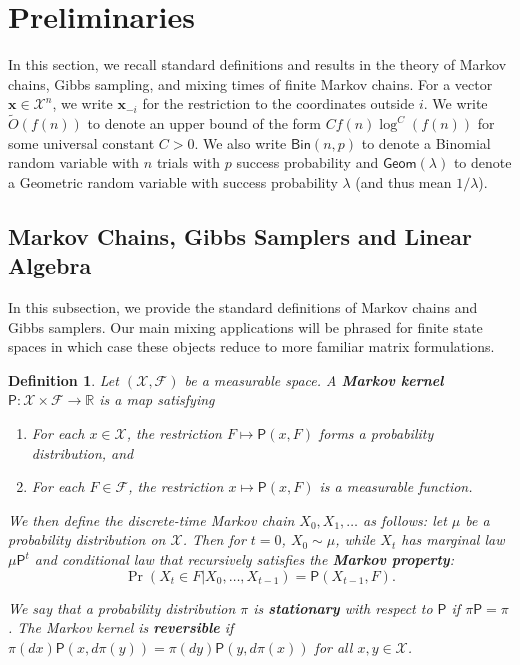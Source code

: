 \documentclass[11pt]{article}
\newtheorem{definition}{Definition}[section]
\begin{document}
\section{Preliminaries}
\label{sec:preliminaries}
In this section, we recall standard definitions and results in the theory of Markov chains, Gibbs sampling, and mixing times of finite Markov chains. For a vector $\bm{x}\in \mathcal{X}^n$, we write $\bm{x}_{-i}$ for the restriction to the coordinates outside $i$. We write $\tilde{O}(f(n))$ to denote an upper bound of the form $Cf(n)\log^C(f(n))$ for some universal constant $C>0$. We also write $\mathsf{Bin}(n,p)$ to denote a Binomial random variable with $n$ trials with $p$ success probability and $\mathsf{Geom}(\lambda)$ to denote a Geometric random variable with success probability $\lambda$ (and thus mean $1/\lambda$).
\subsection{Markov Chains, Gibbs Samplers and Linear Algebra}
In this subsection, we provide the standard definitions of  Markov chains and Gibbs samplers. Our main mixing applications will be phrased for finite state spaces in which case these objects reduce to more familiar matrix formulations.
\begin{definition}
    Let $(\mathcal{X},\mathcal{F})$ be a measurable space. A \textbf{Markov kernel} $\mathsf{P}:\mathcal{X}\times \mathcal{F}\to \mathbb{R}$ is a map satisfying
    \begin{enumerate}
        \item For each $x\in \mathcal{X}$, the restriction $F\mapsto \mathsf{P}(x,F)$ forms a probability distribution, and
        \item For each $F\in \mathcal{F}$, the restriction $x\mapsto \mathsf{P}(x,F)$ is a measurable function.
    \end{enumerate}

    We then define the discrete-time Markov chain $X_0,X_1,\ldots$ as follows: let $\mu$ be a probability distribution on $\mathcal{X}$. Then for $t=0$, $X_0\sim \mu$, while $X_t$ has marginal law $\mu \mathsf{P}^t$ and conditional law that recursively satisfies the \textbf{Markov property}:
    \begin{equation*}
        \Pr(X_t\in F\vert X_0,\ldots,X_{t-1})=\mathsf{P}(X_{t-1},F).
    \end{equation*}

    We say that a probability distribution $\pi$ is \textbf{stationary} with respect to $\mathsf{P}$ if $\pi \mathsf{P}=\pi$. The Markov kernel is \textbf{reversible} if $\pi(dx)\mathsf{P}(x,d\pi(y))=\pi(dy)\mathsf{P}(y,d\pi(x))$ for all $x,y\in \mathcal{X}$.
\end{definition}
\end{document}
